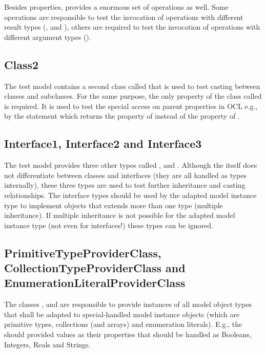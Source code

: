 Besides properties,  provides a enormous set of operations as well. Some operations are responsible to test the invocation of operations with different result types (,  and ), others are required to test the invocation of operations with different argument types ().


\subsection{Class2}

The test model contains a second class called  that is used to test casting between classes and subclasses. For the same purpose, the only property of the class called  is required. It is used to test the special access on parent properties in \acs{OCL} e.g., by the statement  which returns the property of  instead of the property of .


\subsection{Interface1, Interface2 and Interface3}

The test model provides three other types called ,  and . Although the  itself does not differentiate between classes and interfaces (they are all handled as types internally), these three types are used to test further inheritance and casting relationships. The interface types should be used by the adapted model instance type to implement objects that extends more than one type (multiple inheritance). If multiple inheritance is not possible for the adapted model instance type (not even for interfaces!) these types can be ignored.


\subsection{PrimitiveTypeProviderClass, CollectionTypeProviderClass and E\-nu\-me\-ra\-tion\-Li\-te\-ral\-ProviderClass}
\label{modelInstanceTestSuite:specialTypeProviderClasses}

The classes ,  and  are responsible to provide instances of all model object types that shall be adapted to special-handled model instance objects (which are primitive types, collections (and arrays) and enumeration literals). E.g., the  should provided values as their properties that should be handled as Booleans, Integers, Reals and Strings.

